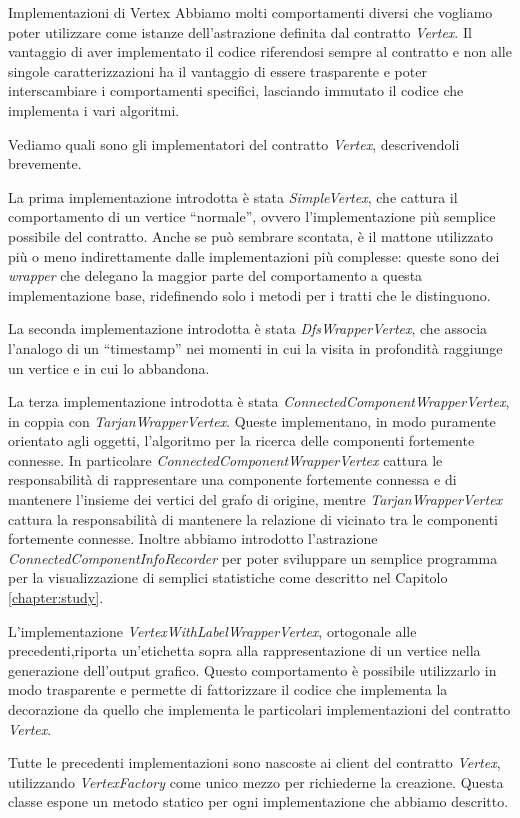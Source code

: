 \begin{paragraph}{Implementazioni di Vertex}
  Abbiamo molti comportamenti diversi che vogliamo poter utilizzare
  come istanze dell'astrazione definita dal contratto
  \emph{Vertex}. Il vantaggio di aver implementato il codice
  riferendosi sempre al contratto e non alle singole caratterizzazioni
  ha il vantaggio di essere trasparente e poter interscambiare i
  comportamenti specifici, lasciando immutato il codice che implementa
  i vari algoritmi.

  Vediamo quali sono gli implementatori del contratto \emph{Vertex},
  descrivendoli brevemente.

  La prima implementazione introdotta \`e stata \emph{SimpleVertex},
  che cattura il comportamento di un vertice ``normale'', ovvero
  l'implementazione pi\`u semplice possibile del contratto. Anche se
  pu\`o sembrare scontata, \`e il mattone utilizzato pi\`u o meno
  indirettamente dalle implementazioni pi\`u complesse: queste sono
  dei \emph{wrapper} che delegano la maggior parte del comportamento a
  questa implementazione base, ridefinendo solo i metodi per i tratti
  che le distinguono.

  La seconda implementazione introdotta \`e stata
  \emph{DfsWrapperVertex}, che associa l'analogo di un ``timestamp''
  nei momenti in cui la visita in profondit\`a raggiunge un vertice e
  in cui lo abbandona. 

  La terza implementazione introdotta \`e stata
  \emph{ConnectedComponentWrapperVertex}, in coppia con
  \emph{TarjanWrapperVertex}. Queste implementano, in modo puramente
  orientato agli oggetti, l'algoritmo per la ricerca delle componenti
  fortemente connesse. In particolare
  \emph{ConnectedComponentWrapperVertex} cattura le responsabilit\`a
  di rappresentare una componente fortemente connessa e di mantenere
  l'insieme dei vertici del grafo di origine, mentre
  \emph{TarjanWrapperVertex} cattura la responsabilit\`a di mantenere
  la relazione di vicinato tra le componenti fortemente
  connesse. Inoltre abbiamo introdotto l'astrazione
  \emph{ConnectedComponentInfoRecorder} per poter sviluppare un
  semplice programma per la visualizzazione di semplici statistiche
  come descritto nel Capitolo \ref{chapter:study}.

  L'implementazione \emph{VertexWithLabelWrapperVertex}, ortogonale
  alle precedenti,riporta un'etichetta sopra alla rappresentazione di
  un vertice nella generazione dell'output grafico. Questo
  comportamento \`e possibile utilizzarlo in modo trasparente e
  permette di fattorizzare il codice che implementa la decorazione da
  quello che implementa le particolari implementazioni del contratto
  \emph{Vertex}.

  Tutte le precedenti implementazioni sono nascoste ai client del
  contratto \emph{Vertex}, utilizzando \emph{VertexFactory} come unico
  mezzo per richiederne la creazione. Questa classe espone un metodo
  statico per ogni implementazione che abbiamo descritto.
\end{paragraph}


